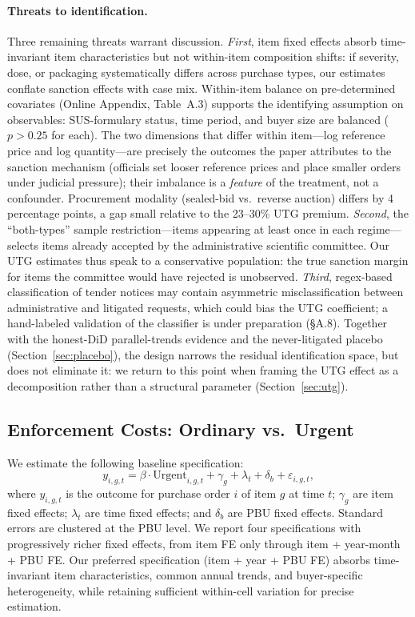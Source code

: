 \paragraph{Threats to identification.} Three remaining threats warrant discussion. \emph{First}, item fixed effects absorb time-invariant item characteristics but not within-item composition shifts: if severity, dose, or packaging systematically differs across purchase types, our estimates conflate sanction effects with case mix. Within-item balance on pre-determined covariates (Online Appendix, Table~A.3) supports the identifying assumption on observables: SUS-formulary status, time period, and buyer size are balanced ($p>0.25$ for each). The two dimensions that differ within item---log reference price and log quantity---are precisely the outcomes the paper attributes to the sanction mechanism (officials set looser reference prices and place smaller orders under judicial pressure); their imbalance is a \emph{feature} of the treatment, not a confounder. Procurement modality (sealed-bid vs.\ reverse auction) differs by 4 percentage points, a gap small relative to the 23--30\% UTG premium. \emph{Second}, the ``both-types'' sample restriction---items appearing at least once in each regime---selects items already accepted by the administrative scientific committee. Our UTG estimates thus speak to a conservative population: the true sanction margin for items the committee would have rejected is unobserved. \emph{Third}, regex-based classification of tender notices may contain asymmetric misclassification between administrative and litigated requests, which could bias the UTG coefficient; a hand-labeled validation of the classifier is under preparation (\S A.8). Together with the honest-DiD parallel-trends evidence and the never-litigated placebo (Section~\ref{sec:placebo}), the design narrows the residual identification space, but does not eliminate it: we return to this point when framing the UTG effect as a decomposition rather than a structural parameter (Section~\ref{sec:utg}).

\subsection{Enforcement Costs: Ordinary vs.\ Urgent}

We estimate the following baseline specification:
\begin{equation}
\label{eq:baseline}
y_{i,g,t} = \beta \cdot \text{Urgent}_{i,g,t} + \gamma_g + \lambda_t + \delta_b + \varepsilon_{i,g,t},
\end{equation}
where $y_{i,g,t}$ is the outcome for purchase order $i$ of item $g$ at time $t$; $\gamma_g$ are item fixed effects; $\lambda_t$ are time fixed effects; and $\delta_b$ are PBU fixed effects. Standard errors are clustered at the PBU level. We report four specifications with progressively richer fixed effects, from item FE only through item + year-month + PBU FE. Our preferred specification (item + year + PBU FE) absorbs time-invariant item characteristics, common annual trends, and buyer-specific heterogeneity, while retaining sufficient within-cell variation for precise estimation.

